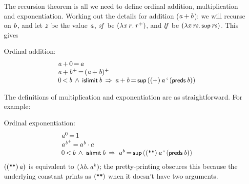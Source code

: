 \documentclass[11pt]{llncs}
\renewcommand{\HOLConst}[1]{{\textsf{\upshape\small #1}}}
\renewcommand{\HOLinline}[1]{\ensuremath{#1}}
\newenvironment{holmath}{\begin{displaymath}\begin{array}{l}}{\end{array}\end{displaymath}\ignorespacesafterend}
\begin{document}
The recursion theorem is all we need to define ordinal addition, multiplication and exponentiation.
Working out the details for addition (\HOLinline{\HOLFreeVar{a}\,\ensuremath{{+}}\,\HOLFreeVar{b}}): we will recurse on \HOLinline{\HOLFreeVar{b}}, and let \HOLinline{\HOLFreeVar{z}} be the value \HOLinline{\HOLFreeVar{a}}, \HOLinline{\HOLFreeVar{sf}} be $(\HOLinline{\ensuremath{{\lambda}}\HOLBoundVar{x}\,\HOLBoundVar{r}\ensuremath{.}\,\HOLBoundVar{r}\HOLTokenSupPlus{}})$, and \HOLinline{\HOLFreeVar{lf}} be $(\HOLinline{\ensuremath{{\lambda}}\HOLBoundVar{x}\,\HOLBoundVar{rs}\ensuremath{.}\,\HOLConst{sup}\,\HOLBoundVar{rs}})$.
This gives
\begin{definition}
Ordinal addition:
\begin{holmath}
\HOLFreeVar{a}\,\ensuremath{{+}}\,0\,{\ensuremath{=}}\,\HOLFreeVar{a}\\
\HOLFreeVar{a}\,\ensuremath{{+}}\,\HOLFreeVar{b}\HOLTokenSupPlus{}\,{\ensuremath{=}}\,(\HOLFreeVar{a}\,\ensuremath{{+}}\,\HOLFreeVar{b})\HOLTokenSupPlus{}\\
0\,\ensuremath{{<}}\,\HOLFreeVar{b}\,\HOLTokenConj{}\,\HOLConst{islimit}\,\HOLFreeVar{b}\,\HOLTokenImp{}\,\HOLFreeVar{a}\,\ensuremath{{+}}\,\HOLFreeVar{b}\,{\ensuremath{=}}\,\HOLConst{sup}\,((\HOLConst{\ensuremath{{+}}})\,\HOLFreeVar{a}\,\textrm{`}\,(\HOLConst{preds}\,\HOLFreeVar{b}))
\end{holmath}
\end{definition}
The definitions of multiplication and exponentiation are as straightforward.
For example:
\begin{definition}
Ordinal exponentiation:
\begin{holmath}
\HOLFreeVar{a}\sp{0}\,{\ensuremath{=}}\,1\\
\HOLFreeVar{a}\sp{\HOLFreeVar{b}\HOLTokenSupPlus{}}\,{\ensuremath{=}}\,\HOLFreeVar{a}\sp{\HOLFreeVar{b}}\,\ensuremath{{\cdot}}\,\HOLFreeVar{a}\\
0\,\ensuremath{{<}}\,\HOLFreeVar{b}\,\HOLTokenConj{}\,\HOLConst{islimit}\,\HOLFreeVar{b}\,\HOLTokenImp{}\,\HOLFreeVar{a}\sp{\HOLFreeVar{b}}\,{\ensuremath{=}}\,\HOLConst{sup}\,((\HOLConst{\HOLTokenExp{}})\,\HOLFreeVar{a}\,\textrm{`}\,(\HOLConst{preds}\,\HOLFreeVar{b}))
\end{holmath}
$(\HOLinline{(\HOLConst{\HOLTokenExp{}})\,\HOLFreeVar{a}})$ is equivalent to $(\HOLinline{\ensuremath{{\lambda}}\HOLBoundVar{b}\ensuremath{.}\,\HOLFreeVar{a}\sp{\HOLBoundVar{b}}})$; the pretty-printing obscures this because the underlying constant prints as \HOLinline{(\HOLConst{\HOLTokenExp{}})} when it doesn't have two arguments.
\end{definition}
\end{document}
